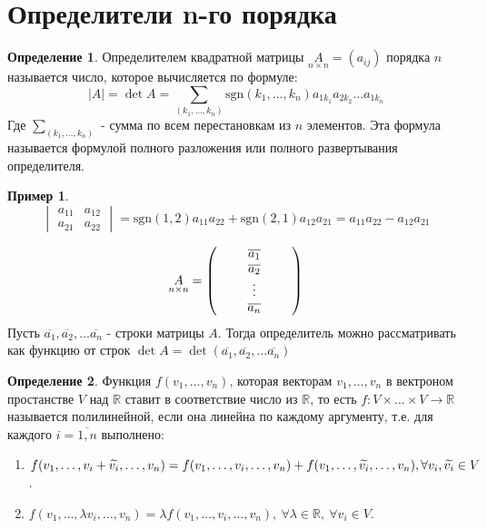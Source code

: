 \documentclass[a4paper, 12pt]{article}
\newcommand{\R}{\mathbb R}
\newcommand\tab[1][.5cm]{\hspace*{#1}}
\theoremstyle{definition}
\newtheorem*{definition}{Определение}
\newtheorem*{example1}{Пример}
\begin{document}
  \section{Определители n-го порядка}
  \begin{definition}
    Определителем квадратной матрицы $\underset{n \times n}{A}=(a_{ij})$ порядка $n$ называется число, которое вычисляется по формуле:
    $$|A|=\det{A}=\sum\limits_{(k_1,\dots,k_n)}\textrm{sgn}(k_1,\dots,k_n)a_{1k_1}a_{2k_2}\dots a_{1k_n}$$
    Где $\sum\limits_{(k_1,\dots,k_n)}$ - сумма по всем перестановкам из $n$ элементов. Эта формула называется формулой полного разложения или полного развертывания определителя.
  \end{definition}
  \begin{example1}
    $$\begin{vmatrix}
      a_{11} & a_{12}\\
      a_{21} & a_{22}  
    \end{vmatrix} = \textrm{sgn}(1,2)a_{11}a_{22}+\textrm{sgn}(2,1)a_{12}a_{21}=a_{11}a_{22}-a_{12}a_{21}$$
  \end{example1}
  $$\underset{n \times n}{A}=\begin{pmatrix}
    \tab & \overline{a_1} & \tab\\
    \null & \overline{a_2} & \null\\
    \null & \vdots & \null\\
    \null & \overline{a_n} & \null
  \end{pmatrix}$$
  Пусть $\overline{a_1}, \overline{a_2}, \dots \overline{a_n}$ - строки матрицы $A$. Тогда определитель можно рассматривать как функцию от строк $\det{A}=\det{(\overline{a_1},\overline{a_2},\dots \overline{a_n})}$
  \begin{definition}
    Функция $f(v_1,\dots, v_n)$, которая векторам $v_1,\dots, v_n$ в вектроном простанстве $V$ над $\R$ ставит в соответствие число из $\R$, то есть $f:V\times\dots\times V\to \R$
    называется полилинейной, если она линейна по каждому аргументу, т.е. для каждого $i=\overline{1,n}$ выполнено:
    \begin{enumerate}
      \item $f(v_1,\dots, v_i+\widetilde{v_i},\dots, v_n)=f(v_1,\dots, v_i,\dots, v_n)+f(v_1,\dots, \widetilde{v_i},\dots, v_n),\\ \forall v_i, \widetilde{v_i}\in V$.
      \item $f(v_1,\dots, \lambda v_i,\dots, v_n)=\lambda f(v_1,\dots, v_i,\dots, v_n),\ \forall \lambda\in \R,\ \forall v_i\in V$.
    \end{enumerate}
  \end{definition}
\end{document}
